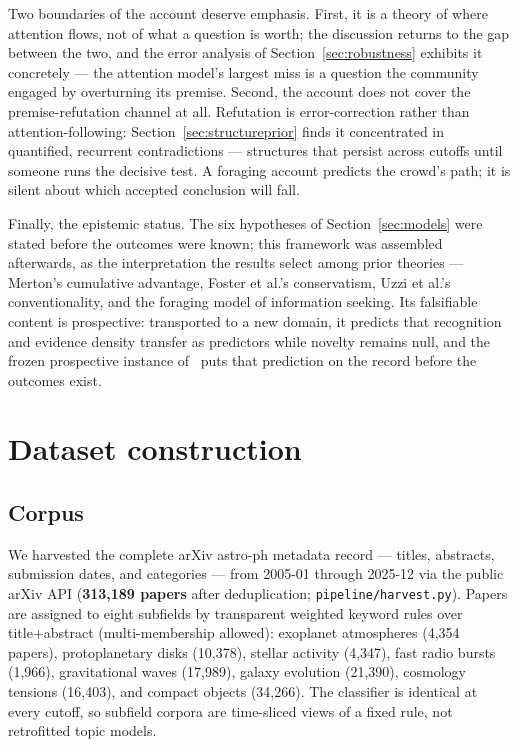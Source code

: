 \documentclass[11pt]{article}
\begin{document}
Two boundaries of the account deserve emphasis. First, it is a theory of
where attention flows, not of what a question is worth; the discussion
returns to the gap between the two, and the error analysis of
Section~\ref{sec:robustness} exhibits it concretely --- the attention
model's largest miss is a question the community engaged by overturning
its premise. Second, the account does not cover the premise-refutation
channel at all. Refutation is error-correction rather than
attention-following: Section~\ref{sec:structureprior} finds it
concentrated in quantified, recurrent contradictions --- structures that
persist across cutoffs until someone runs the decisive test. A foraging
account predicts the crowd's path; it is silent about which accepted
conclusion will fall.

Finally, the epistemic status. The six hypotheses of
Section~\ref{sec:models} were stated before the outcomes were known; this
framework was assembled afterwards, as the interpretation the results
select among prior theories --- Merton's cumulative advantage, Foster et
al.'s conservatism, Uzzi et al.'s conventionality, and the foraging model
of information seeking. Its falsifiable content is prospective:
transported to a new domain, it predicts that recognition and evidence
density transfer as predictors while novelty remains null, and the frozen
prospective instance of~\cite{paper2} puts that prediction on the record
before the outcomes exist.

\section{Dataset construction}

\subsection{Corpus}

We harvested the complete arXiv astro-ph metadata record --- titles,
abstracts, submission dates, and categories --- from 2005-01 through
2025-12 via the public arXiv API (\textbf{313{,}189 papers} after
deduplication; \texttt{pipeline/harvest.py}). Papers are assigned to
eight subfields by transparent weighted keyword rules over
title+abstract (multi-membership allowed): exoplanet atmospheres (4{,}354
papers), protoplanetary disks (10{,}378), stellar activity (4{,}347),
fast radio bursts (1{,}966), gravitational waves (17{,}989), galaxy
evolution (21{,}390), cosmology tensions (16{,}403), and compact objects
(34{,}266). The classifier is identical at every cutoff, so subfield
corpora are time-sliced views of a fixed rule, not retrofitted topic
models.
\end{document}
